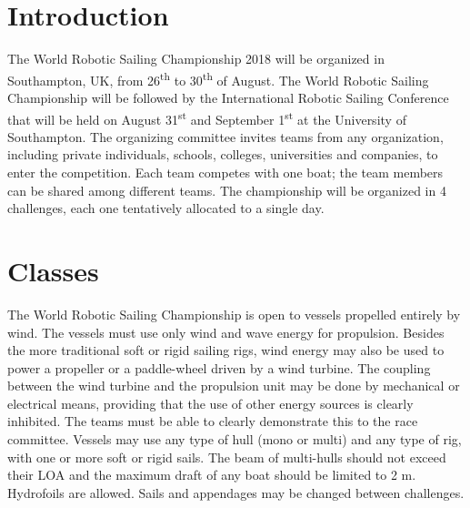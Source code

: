 \documentclass[12pt]{article}
\begin{document}
\maketitle

\section{Introduction}

The World Robotic Sailing Championship 2018 will be organized in Southampton,
UK, from 26\textsuperscript{th} to 30\textsuperscript{th} of August.
The World Robotic Sailing Championship will be followed by
the International Robotic Sailing Conference that will be held on August
31\textsuperscript{st} and September 1\textsuperscript{st} at the University of
Southampton.
The organizing committee invites teams from any organization, including private
individuals, schools, colleges, universities and companies, to enter the competition. 
Each team competes with one boat; the team members can be shared among different teams. 
The championship will be organized in 4 challenges, each one tentatively allocated to a single day.

\section{Classes}

The World Robotic Sailing Championship is open to vessels propelled entirely by
wind. The vessels must use only wind and wave energy for propulsion. 
Besides the more traditional soft or rigid sailing rigs, wind energy may also 
be used to power a propeller or a paddle-wheel driven by a wind turbine. 
The coupling between the wind turbine and the propulsion unit may be done by 
mechanical or electrical means, providing that the use of other energy sources
is clearly inhibited. The teams must be able to clearly demonstrate 
this to the race committee.
Vessels may use any type of hull (mono or multi) and any type of rig, with
one or more soft or rigid sails. The beam of multi-hulls should not exceed their 
LOA and the maximum draft of any boat should be limited to 2 m. 
Hydrofoils are allowed. Sails and appendages may be changed between challenges.
\end{document}

